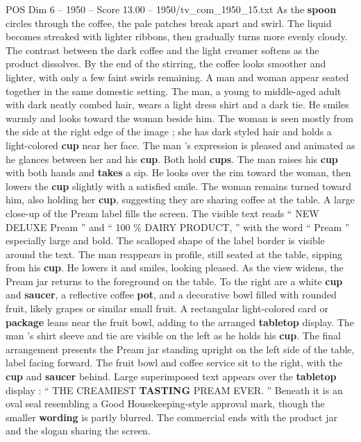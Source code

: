 \begin{textsample}{POS Dim 6 – 1950 – Score 13.00 – 1950/tv\_com\_1950\_15.txt}
As the \textbf{spoon} circles through the coffee, the pale patches break apart and swirl.
The liquid becomes streaked with lighter ribbons, then gradually turns more evenly cloudy.
The contrast between the dark coffee and the light creamer softens as the product dissolves.
By the end of the stirring, the coffee looks smoother and lighter, with only a few faint swirls remaining.
A man and woman appear seated together in the same domestic setting.
The man, a young to middle-aged adult with dark neatly combed hair, wears a light dress shirt and a dark tie.
He smiles warmly and looks toward the woman beside him.
The woman is seen mostly from the side at the right edge of the image ; she has dark styled hair and holds a light-colored \textbf{cup} near her face.
The man ’s expression is pleased and animated as he glances between her and his \textbf{cup}.
Both hold \textbf{cups}.
The man raises his \textbf{cup} with both hands and \textbf{takes} a sip.
He looks over the rim toward the woman, then lowers the \textbf{cup} slightly with a satisfied smile.
The woman remains turned toward him, also holding her \textbf{cup}, suggesting they are sharing coffee at the table.
A large close-up of the Pream label fills the screen.
The visible text reads “ NEW DELUXE Pream ” and “ 100 \% DAIRY PRODUCT, ” with the word “ Pream ” especially large and bold.
The scalloped shape of the label border is visible around the text.
The man reappears in profile, still seated at the table, sipping from his \textbf{cup}.
He lowers it and smiles, looking pleased.
As the view widens, the Pream jar returns to the foreground on the table.
To the right are a white \textbf{cup} and \textbf{saucer}, a reflective coffee \textbf{pot}, and a decorative bowl filled with rounded fruit, likely grapes or similar small fruit.
A rectangular light-colored card or \textbf{package} leans near the fruit bowl, adding to the arranged \textbf{tabletop} display.
The man ’s shirt sleeve and tie are visible on the left as he holds his \textbf{cup}.
The final arrangement presents the Pream jar standing upright on the left side of the table, label facing forward.
The fruit bowl and coffee service sit to the right, with the \textbf{cup} and \textbf{saucer} behind.
Large superimposed text appears over the \textbf{tabletop} display : “ THE CREAMIEST \textbf{TASTING} PREAM EVER. ” Beneath it is an oval seal resembling a Good Housekeeping-style approval mark, though the smaller \textbf{wording} is partly blurred.
The commercial ends with the product jar and the slogan sharing the screen.

\end{textsample}

